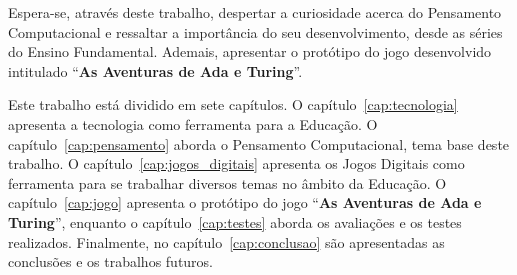 Espera-se, através deste trabalho, despertar a curiosidade acerca do Pensamento Computacional e ressaltar a importância do seu desenvolvimento, desde as séries do Ensino Fundamental. Ademais, apresentar o protótipo do jogo desenvolvido intitulado “\textbf{As Aventuras de Ada e Turing}”.

Este trabalho está dividido em sete capítulos. O capítulo~\ref{cap:tecnologia} apresenta a tecnologia como ferramenta para a Educação. O capítulo~\ref{cap:pensamento} aborda o Pensamento Computacional, tema base deste trabalho. O capítulo~\ref{cap:jogos_digitais} apresenta os Jogos Digitais como ferramenta para se trabalhar diversos temas no âmbito da Educação. O capítulo~\ref{cap:jogo} apresenta o protótipo do jogo “\textbf{As Aventuras de Ada e Turing}”, enquanto o capítulo~\ref{cap:testes} aborda os avaliações e os testes realizados. Finalmente, no capítulo~\ref{cap:conclusao} são apresentadas as conclusões e os trabalhos futuros.

